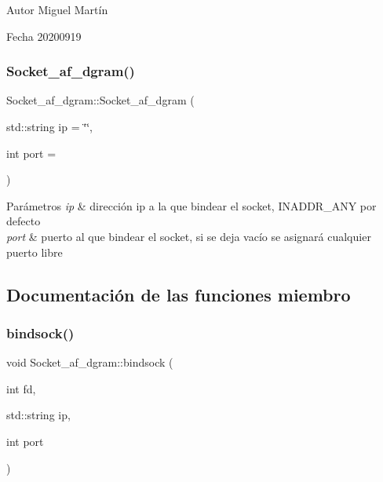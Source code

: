 \begin{DoxyAuthor}{Autor}
Miguel Martín 
\end{DoxyAuthor}
\begin{DoxyDate}{Fecha}
20200919 
\end{DoxyDate}
\mbox{\label{classSocket__af__dgram_a41bd41eb63d780e446275dc5eb320334}} 
\subsubsection{\texorpdfstring{Socket\+\_\+af\+\_\+dgram()}{Socket\_af\_dgram()}\hspace{0.1cm}{\footnotesize\ttfamily [2/2]}}
{\footnotesize\ttfamily Socket\+\_\+af\+\_\+dgram\+::\+Socket\+\_\+af\+\_\+dgram (\begin{DoxyParamCaption}\item[{std\+::string}]{ip = {\ttfamily \char`\"{}\char`\"{}},  }\item[{int}]{port = {} }\end{DoxyParamCaption})}


\begin{DoxyParams}{Parámetros}
{\em ip} & dirección ip a la que bindear el socket, I\+N\+A\+D\+D\+R\+\_\+\+A\+NY por defecto \\
\hline
{\em port} & puerto al que bindear el socket, si se deja vacío se asignará cualquier puerto libre \\
\hline
\end{DoxyParams}


\subsection{Documentación de las funciones miembro}
\mbox{\label{classSocket__af__dgram_a6a2084d50ab117b0bf6b699aa0573db5}} 
\subsubsection{\texorpdfstring{bindsock()}{bindsock()}\hspace{0.1cm}{\footnotesize\ttfamily [1/2]}}
{\footnotesize\ttfamily void Socket\+\_\+af\+\_\+dgram\+::bindsock (\begin{DoxyParamCaption}\item[{int}]{fd,  }\item[{std\+::string}]{ip,  }\item[{int}]{port }\end{DoxyParamCaption})}



